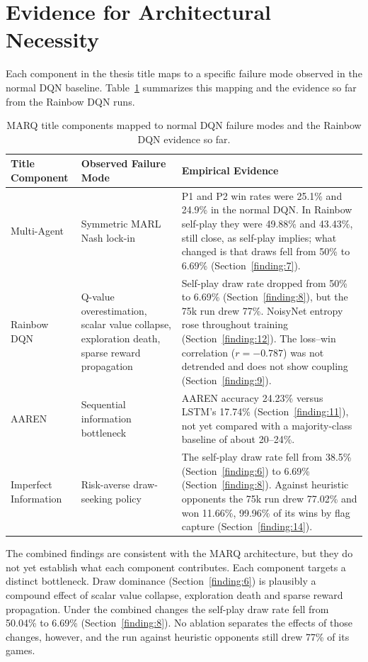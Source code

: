 \section{Evidence for Architectural Necessity}

Each component in the thesis title maps to a specific failure mode observed in the normal DQN baseline. Table~\ref{tab:title_evidence} summarizes this mapping and the evidence so far from the Rainbow DQN runs.

\begin{table}[htbp]
    \centering
    \caption{MARQ title components mapped to normal DQN failure modes and the Rainbow DQN evidence so far.}
    \label{tab:title_evidence}
    \begin{tabular}{|p{2.8cm}|p{4.5cm}|p{6.5cm}|}
        \hline
        \textbf{Title Component} & \textbf{Observed Failure Mode} & \textbf{Empirical Evidence} \\
        \hline
        Multi-Agent & Symmetric MARL Nash lock-in & P1 and P2 win rates were 25.1\% and 24.9\% in the normal DQN. In Rainbow self-play they were 49.88\% and 43.43\%, still close, as self-play implies; what changed is that draws fell from 50\% to 6.69\% (Section~\ref{finding:7}). \\
        \hline
        Rainbow DQN & Q-value overestimation, scalar value collapse, exploration death, sparse reward propagation & Self-play draw rate dropped from 50\% to 6.69\% (Section~\ref{finding:8}), but the 75k run drew 77\%. NoisyNet entropy rose throughout training (Section~\ref{finding:12}). The loss--win correlation ($r = -0.787$) was not detrended and does not show coupling (Section~\ref{finding:9}). \\
        \hline
        AAREN & Sequential information bottleneck & AAREN accuracy 24.23\% versus LSTM's 17.74\% (Section~\ref{finding:11}), not yet compared with a majority-class baseline of about 20--24\%. \\
        \hline
        Imperfect Information & Risk-averse draw-seeking policy & The self-play draw rate fell from 38.5\% (Section~\ref{finding:6}) to 6.69\% (Section~\ref{finding:8}). Against heuristic opponents the 75k run drew 77.02\% and won 11.66\%, 99.96\% of its wins by flag capture (Section~\ref{finding:14}). \\
        \hline
    \end{tabular}
\end{table}

The combined findings are consistent with the MARQ architecture, but they do not yet establish what each component contributes. Each component targets a distinct bottleneck. Draw dominance (Section~\ref{finding:6}) is plausibly a compound effect of scalar value collapse, exploration death and sparse reward propagation. Under the combined changes the self-play draw rate fell from 50.04\% to 6.69\% (Section~\ref{finding:8}). No ablation separates the effects of those changes, however, and the run against heuristic opponents still drew 77\% of its games.


